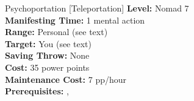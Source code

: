 {Psychoportation [Teleportation]}
{
	\textbf{Level:}
	Nomad 7\\
	\textbf{Manifesting Time:}
	1 mental action\\
	\textbf{Range:}
	Personal (see text)\\
	\textbf{Target:}
	You (see text)\\
	\textbf{Saving Throw:}
	None\\
	\textbf{Cost:}
	35 power points\\
	\textbf{Maintenance Cost:}
	7 pp/hour\\
	\textbf{Prerequisites:}
	, \\
}
